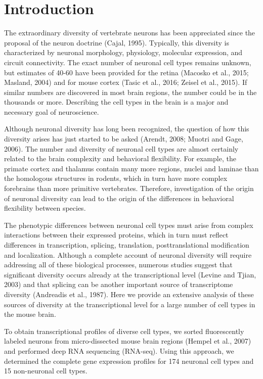 \section*{Introduction}


The extraordinary diversity of vertebrate neurons has been appreciated since the proposal of the neuron doctrine (Cajal, 1995). Typically, this diversity is characterized by neuronal morphology, physiology, molecular expression, and circuit connectivity. The exact number of neuronal cell types remains unknown, but estimates of 40-60 have been provided for the retina (Macosko et al., 2015; Masland, 2004) and for mouse cortex (Tasic et al., 2016; Zeisel et al., 2015). If similar numbers are discovered in most brain regions, the number could be in the thousands or more. Describing the cell types in the brain is a major and necessary goal of neuroscience.

Although neuronal diversity has long been recognized, the question of how this diversity arises has just started to be asked (Arendt, 2008; Muotri and Gage, 2006). The number and diversity of neuronal cell types are almost certainly related to the brain complexity and behavioral flexibility. For example, the primate cortex and thalamus contain many more regions, nuclei and laminae than the homologous structures in rodents, which in turn have more complex forebrains than more primitive vertebrates. Therefore, investigation of the origin of neuronal diversity can lead to the origin of the differences in behavioral flexibility between species. 

The phenotypic differences between neuronal cell types must arise from complex interactions between their expressed proteins, which in turn must reflect differences in transcription, splicing, translation, posttranslational modification and localization. Although a complete account of neuronal diversity will require addressing all of these biological processes, numerous studies suggest that significant diversity occurs already at the transcriptional level (Levine and Tjian, 2003) and that splicing can be another important source of transcriptome diversity (Andreadis et al., 1987). Here we provide an extensive analysis of these sources of diversity at the transcriptional level for a large number of cell types in the mouse brain.

To obtain transcriptional profiles of diverse cell types, we sorted fluorescently labeled neurons from micro-dissected mouse brain regions  (Hempel et al., 2007) and performed deep RNA sequencing (RNA-seq). Using this approach, we determined the complete gene expression profiles for 174 neuronal cell types and 15 non-neuronal cell types.

